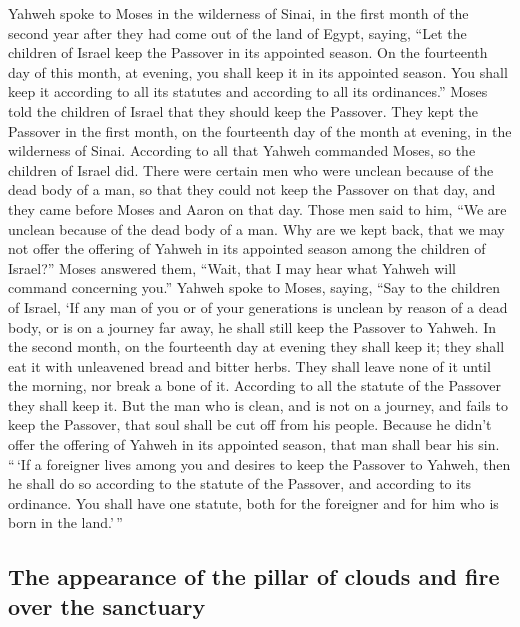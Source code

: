  Yahweh spoke to Moses in the wilderness of Sinai, in the
first month of the second year after they had come out of the land of
Egypt, saying,  ``Let the children of Israel keep the
Passover in its appointed season.  On the fourteenth day
of this month, at evening, you shall keep it in its appointed season.
You shall keep it according to all its statutes and according to all its
ordinances.''  Moses told the children of Israel that they
should keep the Passover.  They kept the Passover in the
first month, on the fourteenth day of the month at evening, in the
wilderness of Sinai. According to all that Yahweh commanded Moses, so
the children of Israel did.  There were certain men who
were unclean because of the dead body of a man, so that they could not
keep the Passover on that day, and they came before Moses and Aaron on
that day.  Those men said to him, ``We are unclean because
of the dead body of a man. Why are we kept back, that we may not offer
the offering of Yahweh in its appointed season among the children of
Israel?''  Moses answered them, ``Wait, that I may hear
what Yahweh will command concerning you.''  Yahweh spoke
to Moses, saying,  ``Say to the children of Israel, `If
any man of you or of your generations is unclean by reason of a dead
body, or is on a journey far away, he shall still keep the Passover to
Yahweh.  In the second month, on the fourteenth day at
evening they shall keep it; they shall eat it with unleavened bread and
bitter herbs.  They shall leave none of it until the
morning, nor break a bone of it. According to all the statute of the
Passover they shall keep it.  But the man who is clean,
and is not on a journey, and fails to keep the Passover, that soul shall
be cut off from his people. Because he didn't offer the offering of
Yahweh in its appointed season, that man shall bear his sin.
 ``\,`If a foreigner lives among you and desires to keep
the Passover to Yahweh, then he shall do so according to the statute of
the Passover, and according to its ordinance. You shall have one
statute, both for the foreigner and for him who is born in the
land.'\,''

\hypertarget{the-appearance-of-the-pillar-of-clouds-and-fire-over-the-sanctuary}{%
\subsection{The appearance of the pillar of clouds and fire over the
sanctuary}\label{the-appearance-of-the-pillar-of-clouds-and-fire-over-the-sanctuary}}

